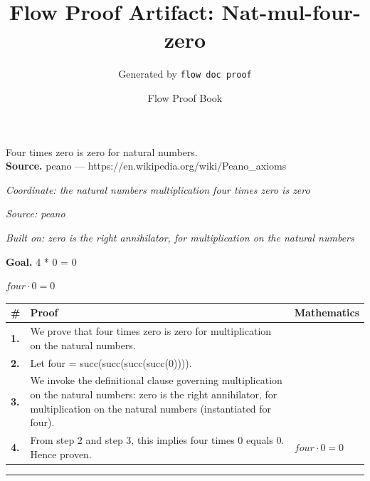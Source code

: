 \documentclass[11pt]{article}
\title{Flow Proof Artifact: Nat-mul-four-zero}
\author{Generated by \texttt{flow doc proof}}
\date{Flow Proof Book}
\theoremstyle{definition}
\begin{document}
\maketitle
Four times zero is zero for natural numbers.\\[0.5em]
\textbf{Source.} peano — https://en.wikipedia.org/wiki/Peano\_axioms\\[0.5em]
\bigskip
{}\par
\smallskip\noindent\textit{Coordinate: the natural numbers \cdot multiplication \cdot four times zero is zero}\par
\smallskip\noindent\textit{Source: peano}\par
\smallskip\noindent\textit{Built on: zero is the right annihilator, for multiplication on the natural numbers}\par
\medskip
\noindent\textbf{Goal.} 4 * 0 = 0\par
\noindent$\displaystyle four \cdot 0 = 0$\par
\medskip
\noindent
\begin{tabular}{@{} >{\raggedright\arraybackslash}p{} >{\raggedright\arraybackslash}p{} >{\raggedleft\arraybackslash}p{} @{}}
\textbf{\#} & \textbf{Proof} & \textbf{Mathematics} \\
\midrule
\textbf{1.} & We prove that four times zero is zero for multiplication on the natural numbers. & \\[0.45em]
\textbf{2.} & Let four = succ(succ(succ(succ(0)))). & \\[0.45em]
\textbf{3.} & We invoke the definitional clause governing multiplication on the natural numbers: zero is the right annihilator, for multiplication on the natural numbers (instantiated for four). & \\[0.45em]
\textbf{4.} & From step 2 and step 3, this implies four times 0 equals 0. Hence proven. & $\displaystyle four \cdot 0 = 0$ \\[0.45em]
\bottomrule
\end{tabular}
\label{thm:Nat-multiplication-four_times_zero_is_zero}
\par\medskip\hrule
\end{document}
